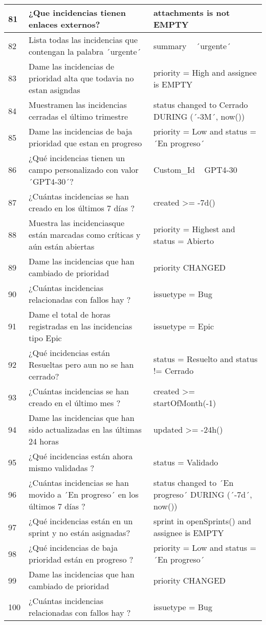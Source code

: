 \begin{center}
\begin{longtable}{ | p{1cm} | p{8cm} | p{6cm} | }
        \hline
        81 & ¿Que incidencias tienen enlaces externos? & attachments is not EMPTY \\
        \hline
        82 & Lista todas las incidencias que contengan la palabra ´urgente´  & summary ~ ´urgente´ \\
        \hline
        83 & Dame las incidencias de prioridad alta que todavia no estan asigndas & priority = High and assignee is EMPTY \\
        \hline
        84 & Muestramen las incidencias cerradas el último trimestre  & status changed to Cerrado DURING (´-3M´, now()) \\
        \hline
        85 & Dame las incidencias de baja prioridad que estan en progreso & priority = Low and status = ´En progreso´ \\
        \hline
        86 & ¿Qué incidencias tienen un campo personalizado con valor ´GPT4-30´? & Custom\_Id ~ GPT4-30 \\
        \hline
        87 & ¿Cuántas incidencias se han creado en los últimos 7 días ? & created >= -7d() \\
        \hline
        88 & Muestra las incidenciasque están marcadas como críticas y aún están abiertas & priority = Highest and status = Abierto \\
        \hline
        89 & Dame las incidencias que han cambiado de prioridad & priority CHANGED \\
        \hline
        90 & ¿Cuántas incidencias relacionadas con fallos hay ? & issuetype = Bug \\
        \hline
        91 & Dame el total de horas registradas en las incidencias tipo Epic & issuetype = Epic \\
        \hline
        92 & ¿Qué incidencias están Resueltas pero aun no se han cerrado? & status = Resuelto and status != Cerrado \\
        \hline
        93 & ¿Cuántas incidencias se han creado en el último mes ? & created >= startOfMonth(-1) \\
        \hline
        94 & Dame las incidencias que han sido actualizadas en las últimas 24 horas  & updated >= -24h() \\
        \hline
        95 & ¿Qué incidencias están ahora mismo validadas ? & status = Validado \\
        \hline
        96 & ¿Cuántas incidencias se han movido a ´En progreso´ en los últimos 7 días ? & status changed to ´En progreso´ DURING (´-7d´, now()) \\
        \hline
        97 & ¿Qué incidencias  están en un sprint y no están asignadas? & sprint in openSprints() and assignee is EMPTY \\
        \hline
        98 & ¿Qué incidencias de baja prioridad están en progreso ? & priority = Low and status = ´En progreso´ \\
        \hline
        99 & Dame las incidencias que han cambiado de prioridad  & priority CHANGED \\
        \hline
        100 & ¿Cuántas incidencias relacionadas con fallos hay ? & issuetype = Bug \\
        \hline
        

\end{longtable}
\end{center}
